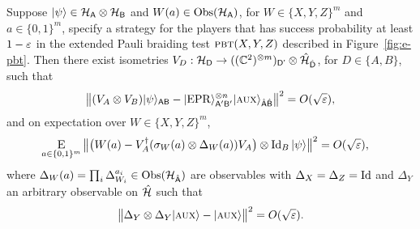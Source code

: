   \begin{lemma}
Suppose $|\psi\rangle\in\mathcal{H}_{\textsf{A}}\otimes \mathcal{H}_{\textsf{B}}$ and $W(a) \in \mathrm{Obs}(\mathcal{H}_{\textsf{A}})$, for $W\in \{X,Y,Z\}^m$ and $a\in\{0,1\}^m$, specify a strategy for the players that has success probability at least $1-\varepsilon$ in the extended Pauli braiding test $\textsc{pbt}(X,Y,Z)$ described in Figure~\ref{fig:e-pbt}. 
Then there exist isometries $V_D:\mathcal{H}_{\textsf{D}} \to ((\mathbb{C}^2)^{\otimes m})_{{\textsf{D'}}}  \otimes \hat{\mathcal{H}}_{\hat{{\textsf{D}}}}$, for $D\in\{A,B\}$, such that
$$\big\| (V_A \otimes V_B) |\psi\rangle_{{\textsf{AB}}} - |{\rm EPR}\rangle_{{\textsf{A}}'{\textsf{B}}'}^{\otimes n} |\textsc {aux}\rangle_{\hat{{\textsf{A}}}\hat{{\textsf{B}}}} \big\|^2 = O(\sqrt{\varepsilon}),$$
and on expectation over  $W\in \{X,Y,Z\}^m$,
\begin{align}\label{eq:test-sigmay-2}
 \mathop{\textsc{E}}_{a\in\{0,1\}^m} \big\| \big(W(a) -V_A^\dagger (\sigma_W(a) \otimes \Delta_W(a)) V_A\big) \otimes \mathop{\rm Id}\nolimits_B |\psi\rangle \big\|^2 &= O(\sqrt{\varepsilon}),
\end{align}
where $\Delta_W(a) = \prod_i \Delta_{W_i}^{a_i} \in \mathrm{Obs}({\mathcal{H}}_{\hat{{\textsf{A}}}})$ are observables with $\Delta_{X}=\Delta_{Z}=\mathop{\rm Id}\nolimits$ and $\Delta_{Y}$ an arbitrary observable on $\hat{\mathcal{H}}$ such that
	$$ \big\|\Delta_Y \otimes \Delta_Y |\textsc {aux}\rangle - |\textsc {aux}\rangle \big\|^2 = O(\sqrt{\varepsilon}).$$
\end{lemma}
